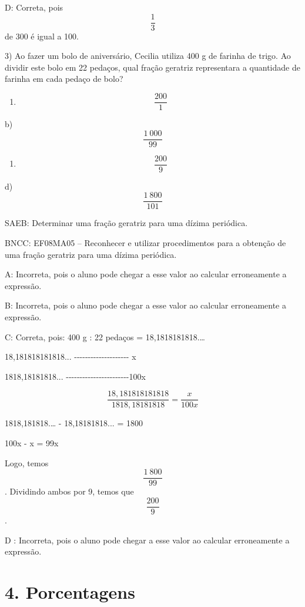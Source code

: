 D: Correta, pois \[\frac {1}{3}\] de 300 é igual a 100.

3) Ao fazer um bolo de aniversário, Cecilia utiliza 400 g de farinha de
trigo. Ao dividir este bolo em 22 pedaços, qual fração geratriz
representara a quantidade de farinha em cada pedaço de bolo?

\begin{enumerate}
\def\labelenumi{\alph{enumi})}
\tightlist
\item
  \[\ \frac{200}{1}\]
\end{enumerate}

b) \[\frac{1\ 000}{99}\]

\begin{enumerate}
\def\labelenumi{\alph{enumi})}
\setcounter{enumi}{2}
\tightlist
\item
  \[\ \frac{200}{9}\]
\end{enumerate}

d) \[\frac{1\ 800}{101}\]

SAEB: Determinar uma fração geratriz para uma dízima periódica.

BNCC: EF08MA05 -- Reconhecer e utilizar procedimentos para a obtenção de
uma fração geratriz para uma dízima periódica.

A: Incorreta, pois o aluno pode chegar a esse valor ao calcular
erroneamente a expressão.

B: Incorreta, pois o aluno pode chegar a esse valor ao calcular
erroneamente a expressão.

C: Correta, pois: 400 g : 22 pedaços = 18,1818181818.\ldots{}

18,181818181818...
-\/-\/-\/-\/-\/-\/-\/-\/-\/-\/-\/-\/-\/-\/-\/-\/-\/-\/-\/- x

1818,18181818...
-\/-\/-\/-\/-\/-\/-\/-\/-\/-\/-\/-\/-\/-\/-\/-\/-\/-\/-\/-\/-\/-\/-100x

\[\frac {18,181818181818}{1818,18181818} = \frac {x}{100x}\]

1818,181818.\ldots{} - 18,18181818... = 1800

100x - x = 99x

Logo, temos \[\frac{1\ 800}{99}\]. Dividindo ambos por 9, temos que
\[\frac{200}{9}\].

D : Incorreta, pois o aluno pode chegar a esse valor ao calcular
erroneamente a expressão.

\hypertarget{porcentagens}{%
\section{4. Porcentagens}\label{porcentagens}}

